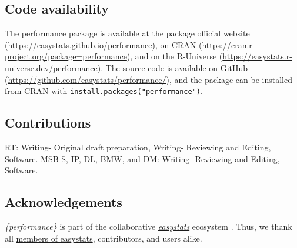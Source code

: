 \documentclass[sn-basic, lineno,pdflatex]{sn-jnl}
\begin{document}
\hypertarget{code-availability}{%
\subsection{Code availability}\label{code-availability}}

The performance package is available at the package official website
(\url{https://easystats.github.io/performance}), on CRAN
(\url{https://cran.r-project.org/package=performance}), and on the
R-Universe (\url{https://easystats.r-universe.dev/performance}). The
source code is available on GitHub
(\url{https://github.com/easystats/performance/}), and the package can
be installed from CRAN with \texttt{install.packages("performance")}.

\hypertarget{contributions}{%
\subsection{Contributions}\label{contributions}}

RT: Writing- Original draft preparation, Writing- Reviewing and Editing,
Software. MSB-S, IP, DL, BMW, and DM: Writing- Reviewing and Editing,
Software.

\hypertarget{acknowledgements}{%
\subsection{Acknowledgements}\label{acknowledgements}}

\emph{\{performance\}} is part of the collaborative
\href{https://github.com/easystats/easystats}{\emph{easystats}}
ecosystem \citep{easystatspackage}. Thus, we thank all
\href{https://github.com/orgs/easystats/people}{members of easystats},
contributors, and users alike.

\renewcommand\refname{References}

\end{document}
